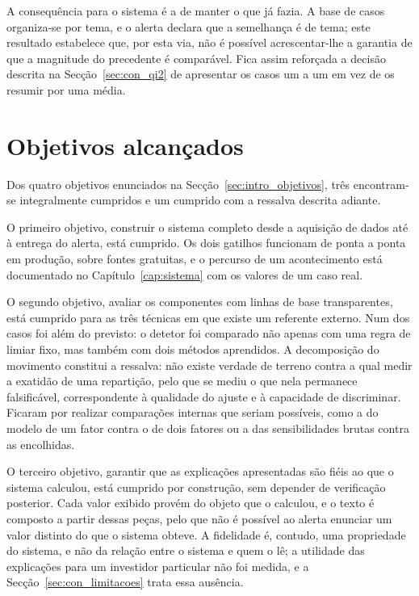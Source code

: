 A consequência para o sistema é a de manter o que já fazia. A base de casos organiza-se por tema,
e o alerta declara que a semelhança é de tema; este resultado estabelece que, por esta via, não é
possível acrescentar-lhe a garantia de que a magnitude do precedente é comparável. Fica assim
reforçada a decisão descrita na Secção~\ref{sec:con_qi2} de apresentar os casos um a um em vez de
os resumir por uma média.

\section{Objetivos alcançados}
\label{sec:con_objetivos}

Dos quatro objetivos enunciados na Secção~\ref{sec:intro_objetivos}, três encontram-se integralmente
cumpridos e um cumprido com a ressalva descrita adiante.

O primeiro objetivo, construir o sistema completo desde a aquisição de dados até à entrega do alerta,
está cumprido. Os dois gatilhos funcionam de ponta a ponta em produção, sobre fontes gratuitas, e o
percurso de um acontecimento está documentado no Capítulo~\ref{cap:sistema} com os valores de um caso
real.

O segundo objetivo, avaliar os componentes com linhas de base transparentes, está cumprido
para as três técnicas em que existe um referente externo. Num dos casos foi além do previsto: o
detetor foi comparado não apenas com uma regra de limiar fixo, mas também com dois métodos
aprendidos.
A decomposição do movimento constitui a ressalva: não existe verdade de terreno contra a qual medir a
exatidão de uma repartição, pelo que se mediu o que nela permanece falsificável, correspondente à
qualidade do ajuste e à capacidade de discriminar. Ficaram por realizar comparações internas que
seriam possíveis, como a do modelo de um fator contra o de dois fatores ou a das sensibilidades
brutas contra as encolhidas.

O terceiro objetivo, garantir que as explicações apresentadas são fiéis ao que o sistema calculou,
está cumprido por construção, sem depender de verificação posterior. Cada valor exibido provém do objeto que
o calculou, e o texto é composto a partir dessas peças, pelo que não é possível ao alerta enunciar um
valor distinto do que o sistema obteve. A fidelidade é, contudo, uma propriedade do sistema, e não da
relação entre o sistema e quem o lê; a utilidade das explicações para um investidor particular não
foi medida, e a Secção~\ref{sec:con_limitacoes} trata essa ausência.

